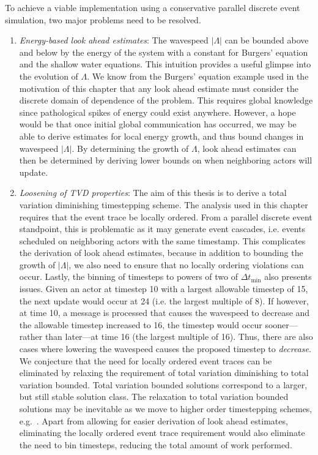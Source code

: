 \documentclass[10pt,letterpaper]{article}
\begin{document}
To achieve a viable implementation using a conservative parallel discrete event simulation, two major problems need to be resolved. 
\begin{enumerate}
\item {\em Energy-based look ahead estimates}: The wavespeed $|\Lambda|$ can be bounded above and below by the energy of the system with a constant for Burgers' equation and the shallow water equations. This intuition provides a useful glimpse into the evolution of $\Lambda$. We know from the Burgers' equation example used in the motivation of this chapter that any look ahead estimate must consider the discrete domain of dependence of the problem. This requires global knowledge since pathological spikes of energy could exist anywhere. 
However, a hope would be that once initial global communication has occurred, we may be able to derive estimates for local energy growth, and thus bound changes in wavespeed $|\Lambda|$. By determining the growth of $\Lambda$, look ahead estimates can then be determined by deriving lower bounds on when neighboring actors will update.

\item {\em Loosening of TVD properties}: The aim of this thesis is to derive a total variation diminishing timestepping scheme. The analysis used in this chapter requires that the event trace be locally ordered. From a parallel discrete event standpoint, this is problematic as it may generate event cascades, i.e. events scheduled on neighboring actors with the same timestamp. This complicates the derivation of look ahead estimates, because in addition to bounding the growth of $|\Lambda|$, we also need to ensure that no locally ordering violations can occur. Lastly, the binning of timesteps to powers of two of $\Delta t_{\min}$ also presents issues. Given an actor at timestep 10 with a largest allowable timestep of 15, the next update would occur at 24 (i.e. the largest multiple of 8). If however, at time 10, a message is processed that causes the wavespeed to decrease and the allowable timestep increased to 16, the timestep would occur sooner---rather than later---at time 16 (the largest multiple of 16). Thus, there are also cases where lowering the wavespeed causes the proposed timestep to {\em decrease}. We conjecture that the need for locally ordered event traces can be eliminated by relaxing the requirement of total variation diminishing to total variation bounded. Total variation bounded solutions correspond to a larger, but still stable solution class. The relaxation to total variation bounded solutions may be inevitable as we move to higher order timestepping schemes, e.g.~\cite{Constantinescu2007}. Apart from allowing for easier derivation of look ahead estimates, eliminating the locally ordered event trace requirement would also eliminate the need to bin timesteps, reducing the total amount of work  performed.
\end{enumerate}
\end{document}
